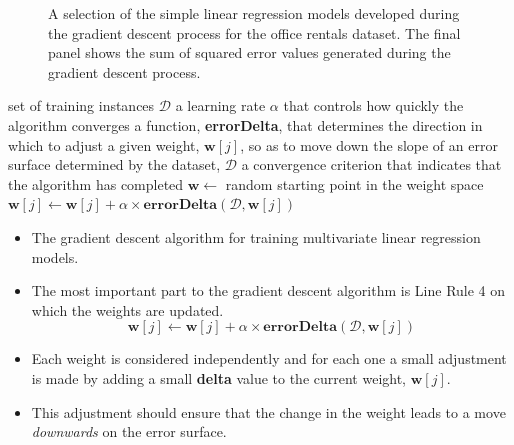 \documentclass[xcolor={table}]{beamer}
\newcommand{\indexkeyword}[1]{\alert{\textbf{#1}\index{#1}}}
\begin{document}
\begin{frame} [plain]
\begin{figure}[htb]
\begin{center}
\caption{A selection of the simple linear regression models developed during the gradient descent process for the office rentals dataset. The final panel shows the sum of squared error values generated during the gradient descent process. }
\label{fig:officeGradientDescentSmallMultiples}
\end{center}
\end{figure}
\end{frame} 




\begin{frame}
\begin{algorithmic}[1]
\REQUIRE set of training instances $\mathcal{D}$
\REQUIRE a learning rate $\alpha$ that controls how quickly the algorithm converges
\REQUIRE a function, \textbf{errorDelta}, that determines the direction in which to adjust a given weight, $\mathbf{w}[j]$, so as to move down the slope of an error surface determined by the dataset, $\mathcal{D}$ 
\REQUIRE a convergence criterion that indicates that the algorithm has completed 
\STATE $\mathbf{w} \leftarrow $ random starting point in the weight space
\REPEAT
		\STATE $\mathbf{w}[j] \leftarrow \mathbf{w}[j] + \alpha \times \textbf{errorDelta}(\mathcal{D}, \mathbf{w}[j])$ \label{algLine:weightUpdateRule}
	\ENDFOR	
{} 
\end{algorithmic}
\begin{itemize}
\item \alert{The gradient descent algorithm for training multivariate linear regression models.}
\end{itemize}
\end{frame}

\begin{frame}
\begin{itemize}
\item The most important part to the gradient descent algorithm is Line Rule 4 on which the weights are updated. 
\begin{equation*}
\mathbf{w}[j] \leftarrow \mathbf{w}[j] + \alpha \times \textbf{errorDelta}(\mathcal{D}, \mathbf{w}[j])
\end{equation*}
\item Each weight is considered independently and for each one a small adjustment is made by adding a small \indexkeyword{delta} value to the current weight, $\mathbf{w}[j]$. 
\item This adjustment should ensure that the change in the weight leads to a move \textit{downwards} on the error surface. 
\end{itemize}
\end{frame}
 
\end{document}
